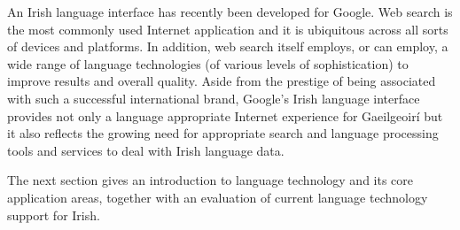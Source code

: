 \begin{multicols}{2}
An Irish language interface has recently been developed for Google. Web search is the most commonly used Internet application and it is ubiquitous across all sorts of devices and platforms. In addition, web search itself employs, or can employ, a wide range of language technologies (of various levels of sophistication) to improve results and overall quality. Aside from the prestige of being associated with such a successful international brand, Google’s Irish language interface provides not only a language appropriate Internet experience for Gaeilgeoirí but it also reflects the growing need for appropriate search and language processing tools and services to deal with Irish language data.

The next section gives an introduction to language technology and its core application areas, together with an evaluation of current language technology support for Irish.

\end{multicols}
\clearpage


\label{LTforIrish_en}

